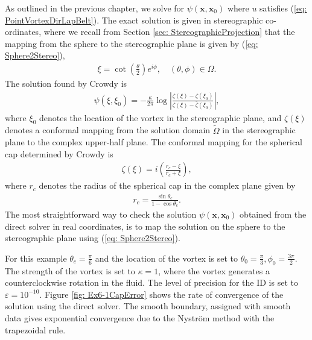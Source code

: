 \documentclass{sfuthesis}
\begin{document}
As outlined in the previous chapter, we solve for $\psi(\mathbf{x}, \mathbf{x}_0)$ where $u$ satisfies (\ref{eq: PointVortexDirLapBelt}).
The exact solution is given in stereographic co-ordinates, where we recall from Section \ref{sec: StereographicProjection}  that the mapping from the sphere to the stereographic plane is given by (\ref{eq: Sphere2Stereo}),
\begin{align*}
	\xi=\cot \left(\frac{\theta}{2}\right) e^{i\phi}, \quad (\theta, \phi)\in \Omega.
\end{align*}
The solution found by Crowdy \cite{Crowdy2006} is 
\begin{align*}
	\psi(\xi, \xi_0)=-\frac{\kappa}{2\pi} \log \left| \frac{\zeta(\xi)-\zeta(\xi_0)}{\zeta(\xi)-\bar{\zeta}(\xi_0)} \right|,
\end{align*} 
where $\xi_0$ denotes the location of the vortex in the stereographic plane, and $\zeta(\xi)$ denotes a conformal mapping from the solution domain $\tilde{\Omega}$ in the stereographic plane to the complex upper-half plane. The conformal mapping for the spherical cap determined by Crowdy \cite{Crowdy2006} is
\begin{align*}
	\zeta(\xi)=i\left(\frac{r_c-\xi}{r_c+\xi}\right),
\end{align*}
where $r_c$ denotes the radius of the spherical cap in the complex plane given by 
\begin{align*}
	r_c=\frac{\sin \theta_c}{1- \cos \theta_c}.
\end{align*}
The most straightforward way to check the solution $\psi(\mathbf{x}, \mathbf{x}_0)$ obtained from the direct solver in real coordinates, is to map the solution on the sphere to the stereographic plane using (\ref{eq: Sphere2Stereo}). 

For this example $\theta_c=\frac{\pi}{6}$ and the location of the vortex is set to $\theta_0=\frac{\pi}{3}, \phi_0=\frac{3\pi}{2}$. The strength of the vortex is set to $\kappa=1$, where the vortex generates a counterclockwise rotation in the fluid. The level of precision for the ID is set to $\varepsilon=10^{-10}$.
Figure \ref{fig: Ex6-1CapError} shows the rate of convergence of the solution using the direct solver. The smooth boundary, assigned with smooth data gives exponential convergence due to the Nystr\"{o}m method with the trapezoidal rule. 
\end{document}
